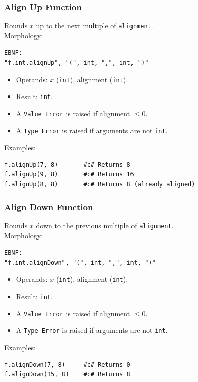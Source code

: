 \subsubsection{Align Up Function}
Rounds $x$ up to the next multiple of \texttt{alignment}. \\
Morphology:
\begin{verbatim}
EBNF:
"f.int.alignUp", "(", int, ",", int, ")"
\end{verbatim}
\begin{itemize}
\item Operands: $x$ (\texttt{int}), alignment (\texttt{int}).
\item Result: \texttt{int}.
\item A \texttt{Value Error} is raised if alignment $\leq 0$.
\item A \texttt{Type Error} is raised if arguments are not \texttt{int}.
\end{itemize}
Examples:
\begin{verbatim}
f.alignUp(7, 8)       #c# Returns 8
f.alignUp(9, 8)       #c# Returns 16
f.alignUp(8, 8)       #c# Returns 8 (already aligned)
\end{verbatim}

\subsubsection{Align Down Function}
Rounds $x$ down to the previous multiple of \texttt{alignment}. \\
Morphology:
\begin{verbatim}
EBNF:
"f.int.alignDown", "(", int, ",", int, ")"
\end{verbatim}
\begin{itemize}
\item Operands: $x$ (\texttt{int}), alignment (\texttt{int}).
\item Result: \texttt{int}.
\item A \texttt{Value Error} is raised if alignment $\leq 0$.
\item A \texttt{Type Error} is raised if arguments are not \texttt{int}.
\end{itemize}
Examples:
\begin{verbatim}
f.alignDown(7, 8)     #c# Returns 0
f.alignDown(15, 8)    #c# Returns 8
\end{verbatim}

